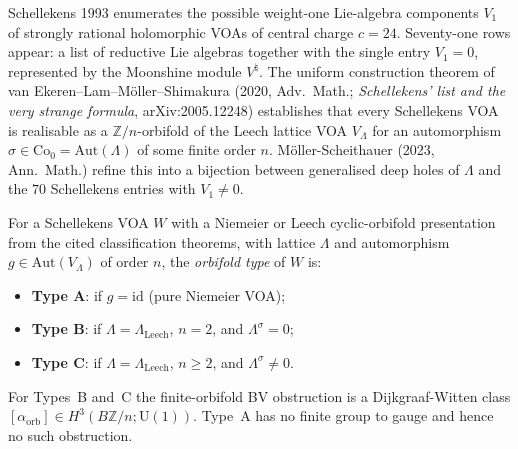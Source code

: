 Schellekens 1993 enumerates the possible weight-one
Lie-algebra components $V_1$ of strongly rational holomorphic
VOAs of central charge $c = 24$. Seventy-one rows appear: a
list of reductive Lie algebras together with the single entry
$V_1 = 0$, represented by the Moonshine module
$V^\natural$. The uniform construction
theorem of van Ekeren--Lam--M\"oller--Shimakura (2020, Adv.~Math.;
\emph{Schellekens' list and the very strange formula}, arXiv:2005.12248)
establishes that every Schellekens VOA is realisable as a
$\mathbb{Z}/n$-orbifold of the Leech lattice VOA $V_\Lambda$ for an
automorphism $\sigma \in \mathrm{Co}_0 = \mathrm{Aut}(\Lambda)$ of some
finite order $n$. M\"oller-Scheithauer (2023, Ann.~Math.) refine this
into a bijection between generalised deep holes of $\Lambda$ and the
$70$ Schellekens entries with $V_1 \ne 0$.

\begin{definition}
\label{def:schellekens-orbifold-type}
For a Schellekens VOA $W$ with a Niemeier or Leech cyclic-orbifold
presentation from the cited classification theorems, with lattice
$\Lambda$ and automorphism
$g \in \mathrm{Aut}(V_\Lambda)$ of order $n$, the \emph{orbifold type}
of $W$ is:
\begin{itemize}
\item \textbf{Type A}: if $g = \mathrm{id}$ (pure Niemeier VOA);
\item \textbf{Type B}: if $\Lambda = \Lambda_{\mathrm{Leech}}$,
$n = 2$, and $\Lambda^\sigma = 0$;
\item \textbf{Type C}: if $\Lambda = \Lambda_{\mathrm{Leech}}$,
$n \ge 2$, and $\Lambda^\sigma \ne 0$.
\end{itemize}
For Types~B and~C the finite-orbifold BV obstruction is a
Dijkgraaf-Witten class
$[\alpha_{\mathrm{orb}}]\in H^3(B\mathbb{Z}/n;\mathrm{U}(1))$. Type~A
has no finite group to gauge and hence no such obstruction.
\end{definition}


